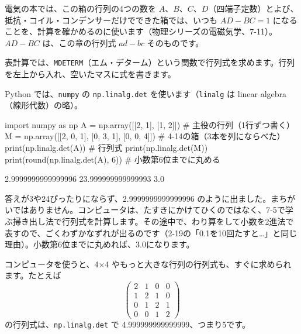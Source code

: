 \noindent 電気の本では、この箱の行列の4つの数を $A$、$B$、$C$、$D$（四端子定数）とよび、抵抗・コイル・コンデンサーだけでできた箱では、いつも $AD-BC=1$ になることを、計算を確かめるのに使います（物理シリーズの電磁気学、7-11）。$AD-BC$ は、この章の行列式 $ad-bc$ そのものです。


\leavevmode\label{bk:7-4:computer}表計算では、\texttt{MDETERM}（エム・デターム）という関数で行列式を求めます。行列を左上から入れ、空いたマスに式を書きます。
\begin{bkcenter}
\end{bkcenter}
Python では、\texttt{numpy} の \texttt{np.linalg.det} を使います（\texttt{linalg} は linear algebra（線形代数）の略）。
\begin{bkcode}[Python]
import numpy as np
A = np.array([[2, 1],
              [1, 2]])           \# 主役の行列（1行ずつ書く）
M = np.array([[2, 0, 1],
              [0, 3, 1],
              [0, 0, 4]])        \# 4-14の箱（3本を列にならべた）
print(np.linalg.det(A))          \# 行列式
print(np.linalg.det(M))
print(round(np.linalg.det(A), 6))   \# 小数第6位までに丸める
\end{bkcode}
\begin{bkcodeout}[実行結果]
2.9999999999999996
23.999999999999993
3.0
\end{bkcodeout}
答えが3や24ぴったりにならず、2.9999999999999996 のように出ました。まちがいではありません。コンピュータは、たすきにかけてひくのではなく、7-5で学ぶ掃き出し法で行列式を計算します。その途中で、わり算をして小数を2進法で表すので、ごくわずかなずれが出るのです（2-19の「0.1を10回たすと…」と同じ理由）。小数第6位までに丸めれば、3.0になります。

\noindent コンピュータを使うと、4×4 やもっと大きな行列の行列式も、すぐに求められます。たとえば
\[ \begin{pmatrix}2&1&0&0\\1&2&1&0\\0&1&2&1\\0&0&1&2\end{pmatrix} \]
の行列式は、\texttt{np.linalg.det} で 4.999999999999999、つまり5です。

